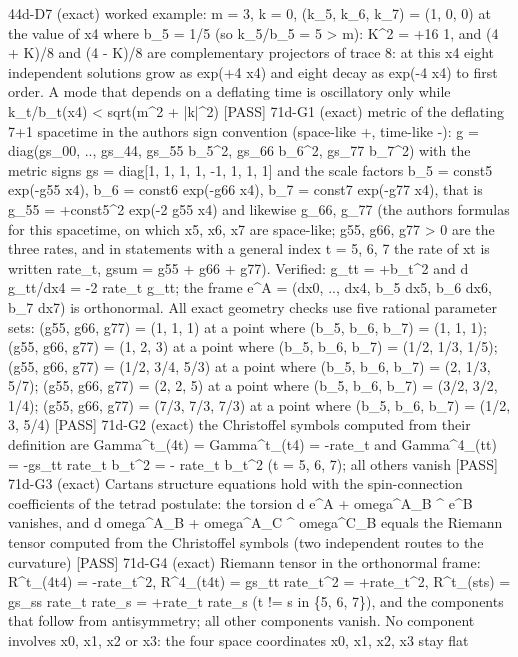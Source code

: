 \documentclass[
  10pt,
]{article}
\newenvironment{Shaded}{}{}
\newcommand{\NormalTok}[1]{#1}
\begin{document}
\begin{Shaded}
\begin{Highlighting}[]
\NormalTok{[PASS] 44d{-}D7  (exact) worked example: m = 3, k = 0, (k\_5, k\_6, k\_7) = (1, 0, 0) at the value of x4 where b\_5 = 1/5 (so k\_5/b\_5 = 5 \textgreater{} m): K\^{}2 = +16 1, and (4 + K)/8 and (4 {-} K)/8 are complementary projectors of trace 8: at this x4 eight independent solutions grow as exp(+4 x4) and eight decay as exp({-}4 x4) to first order. A mode that depends on a deflating time is oscillatory only while k\_t/b\_t(x4) \textless{} sqrt(m\^{}2 + |k|\^{}2)}
\NormalTok{[PASS] 71d{-}G1  (exact) metric of the deflating 7+1 spacetime in the author\textquotesingle{}s sign convention (space{-}like +, time{-}like {-}): g = diag(gs\_00, .., gs\_44, gs\_55 b\_5\^{}2, gs\_66 b\_6\^{}2, gs\_77 b\_7\^{}2) with the metric signs gs = diag[1, 1, 1, 1, {-}1, 1, 1, 1] and the scale factors b\_5 = const5 exp({-}g55 x4), b\_6 = const6 exp({-}g66 x4), b\_7 = const7 exp({-}g77 x4), that is g\_55 = +const5\^{}2 exp({-}2 g55 x4) and likewise g\_66, g\_77 (the author\textquotesingle{}s formulas for this spacetime, on which x5, x6, x7 are space{-}like; g55, g66, g77 \textgreater{} 0 are the three rates, and in statements with a general index t = 5, 6, 7 the rate of xt is written rate\_t, gsum = g55 + g66 + g77). Verified: g\_tt = +b\_t\^{}2 and d g\_tt/dx4 = {-}2 rate\_t g\_tt; the frame e\^{}A = (dx0, .., dx4, b\_5 dx5, b\_6 dx6, b\_7 dx7) is orthonormal. All exact geometry checks use five rational parameter sets: (g55, g66, g77) = (1, 1, 1) at a point where (b\_5, b\_6, b\_7) = (1, 1, 1); (g55, g66, g77) = (1, 2, 3) at a point where (b\_5, b\_6, b\_7) = (1/2, 1/3, 1/5); (g55, g66, g77) = (1/2, 3/4, 5/3) at a point where (b\_5, b\_6, b\_7) = (2, 1/3, 5/7); (g55, g66, g77) = (2, 2, 5) at a point where (b\_5, b\_6, b\_7) = (3/2, 3/2, 1/4); (g55, g66, g77) = (7/3, 7/3, 7/3) at a point where (b\_5, b\_6, b\_7) = (1/2, 3, 5/4)}
\NormalTok{[PASS] 71d{-}G2  (exact) the Christoffel symbols computed from their definition are Gamma\^{}t\_(4t) = Gamma\^{}t\_(t4) = {-}rate\_t and Gamma\^{}4\_(tt) = {-}gs\_tt rate\_t b\_t\^{}2 = {-} rate\_t b\_t\^{}2 (t = 5, 6, 7); all others vanish}
\NormalTok{[PASS] 71d{-}G3  (exact) Cartan\textquotesingle{}s structure equations hold with the spin{-}connection coefficients of the tetrad postulate: the torsion d e\^{}A + omega\^{}A\_B \^{} e\^{}B vanishes, and d omega\^{}A\_B + omega\^{}A\_C \^{} omega\^{}C\_B equals the Riemann tensor computed from the Christoffel symbols (two independent routes to the curvature)}
\NormalTok{[PASS] 71d{-}G4  (exact) Riemann tensor in the orthonormal frame: R\^{}t\_(4t4) = {-}rate\_t\^{}2, R\^{}4\_(t4t) = gs\_tt rate\_t\^{}2 = +rate\_t\^{}2, R\^{}t\_(sts) = gs\_ss rate\_t rate\_s = +rate\_t rate\_s (t != s in \{5, 6, 7\}), and the components that follow from antisymmetry; all other components vanish. No component involves x0, x1, x2 or x3: the four space coordinates x0, x1, x2, x3 stay flat}

\end{Highlighting}
\end{Shaded}
\end{document}
